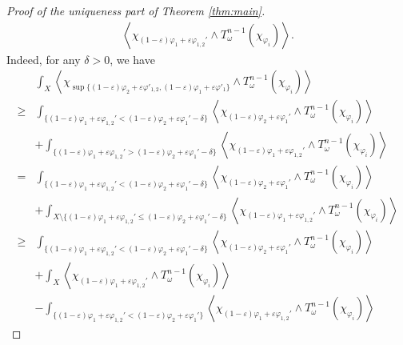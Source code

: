 \documentclass[10pt,a4paper]{amsart}
\numberwithin{equation}{section}
\begin{document}
\begin{proof}[Proof of the uniqueness part of Theorem \ref{thm:main}]
\begin{equation}
\begin{split}
        \left\langle\chi_{(1-\varepsilon)\varphi_1+\varepsilon\varphi_{1,2}'}\wedge T^{n-1}_\omega(\chi_{\varphi_i})\right\rangle.
    \end{split}
    \end{equation}
    Indeed, for any $\delta>0$, we have
    \begin{equation*}
        \begin{split}
            &\int_X \left\langle\chi_{\sup\{(1-\varepsilon)\varphi_2+\varepsilon\varphi'_{1,2},(1-\varepsilon)\varphi_1+\varepsilon\varphi'_1\}}\wedge T^{n-1}_\omega(\chi_{\varphi_i})\right\rangle\\
            \ge&\int_{\{(1-\varepsilon)\varphi_1+\varepsilon\varphi_{1,2}'<(1-\varepsilon)\varphi_2+\varepsilon\varphi_1'-\delta\}}\left\langle\chi_{(1-\varepsilon)\varphi_2+\varepsilon\varphi_1'}\wedge T^{n-1}_\omega(\chi_{\varphi_i})\right\rangle\\
            &+\int_{\{(1-\varepsilon)\varphi_1+\varepsilon\varphi_{1,2}'>(1-\varepsilon)\varphi_2+\varepsilon\varphi_1'-\delta\}}\left\langle\chi_{(1-\varepsilon)\varphi_1+\varepsilon\varphi_{1,2}'}\wedge T^{n-1}_\omega(\chi_{\varphi_i})\right\rangle\\
            =&\int_{\{(1-\varepsilon)\varphi_1+\varepsilon\varphi_{1,2}'<(1-\varepsilon)\varphi_2+\varepsilon\varphi_1'-\delta\}}\left\langle\chi_{(1-\varepsilon)\varphi_2+\varepsilon\varphi_1'}\wedge T^{n-1}_\omega(\chi_{\varphi_i})\right\rangle\\
            &+\int_{X\setminus{\{(1-\varepsilon)\varphi_1+\varepsilon\varphi_{1,2}'\le(1-\varepsilon)\varphi_2+\varepsilon\varphi_1'-\delta\}}}\left\langle\chi_{(1-\varepsilon)\varphi_1+\varepsilon\varphi_{1,2}'}\wedge T^{n-1}_\omega(\chi_{\varphi_i})\right\rangle\\
            \ge&\int_{\{(1-\varepsilon)\varphi_1+\varepsilon\varphi_{1,2}'<(1-\varepsilon)\varphi_2+\varepsilon\varphi_1'-\delta\}}\left\langle\chi_{(1-\varepsilon)\varphi_2+\varepsilon\varphi_1'}\wedge T^{n-1}_\omega(\chi_{\varphi_i})\right\rangle\\
            &+\int_X\left\langle\chi_{(1-\varepsilon)\varphi_1+\varepsilon\varphi_{1,2}'}\wedge T^{n-1}_\omega(\chi_{\varphi_i})\right\rangle\\
            &-\int_{\{(1-\varepsilon)\varphi_1+\varepsilon\varphi_{1,2}'<(1-\varepsilon)\varphi_2+\varepsilon\varphi_1'\}}\left\langle\chi_{(1-\varepsilon)\varphi_1+\varepsilon\varphi_{1,2}'}\wedge T^{n-1}_\omega(\chi_{\varphi_i})\right\rangle
        \end{split}

\end{equation*}
\end{proof}
\end{document}
